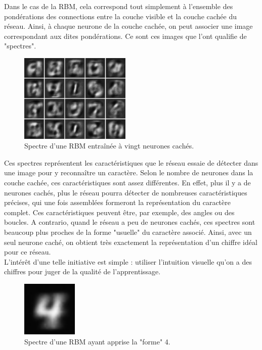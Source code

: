 \documentclass[a4paper,oneside]{report}
\begin{document}
                Dans le cas de la RBM, cela correspond tout simplement à l'ensemble des pondérations 
des connections entre la couche visible et la couche cachée du réseau. Ainsi, à chaque 
neurone de la couche cachée, 
on peut associer une image correspondant aux dites pondérations. Ce sont ces images que l'ont qualifie 
de "spectres".

                \begin{figure}
                    \begin{center}
                        \includegraphics[width=150pt]{Images/filters-01.png}
                    \end{center}
                    \caption{Spectre d'une RBM entraînée à vingt neurones cachés.}
                \end{figure}

                Ces spectres représentent les caractéristiques que le réseau essaie de détecter dans 
une image pour y reconnaître un caractère. Selon le nombre de neurones dans la couche 
cachée, ces caractéristiques 
sont assez différentes. En effet, plus il y a de neurones cachés, plus le réseau pourra détecter de 
nombreuses caractéristiques précises, qui une fois assemblées formeront la représentation du 
caractère complet. Ces caractéristiques peuvent être, par exemple, des angles ou des boucles. A 
contrario, quand le réseau a peu de neurones cachés, ces spectres sont beaucoup plus proches de la 
forme 
"usuelle" du caractère associé. Ainsi, avec un seul neurone caché, on obtient très exactement la 
représentation d'un chiffre idéal pour ce réseau.\\

                L'intérêt d'une telle initiative est simple : utiliser l'intuition visuelle qu'on a 
des chiffres pour juger de la qualité de l'apprentissage.

                \begin{figure}
                    \begin{center}
                        \includegraphics[width=75pt]{Images/spectres-01.png}
                    \end{center}
                    \caption{Spectre d'une RBM ayant apprise la "forme" 4.}
                \end{figure}
\end{document}
